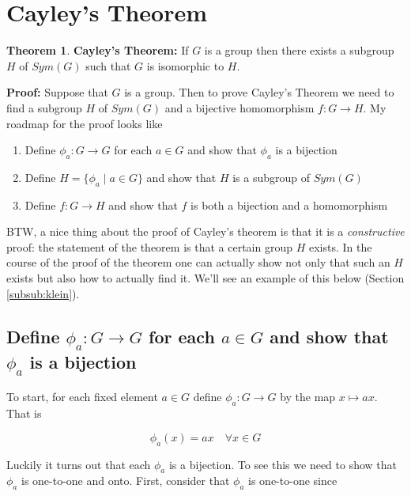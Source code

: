 \documentclass[11pt, oneside]{article}   	%
\theoremstyle{definition}
\newtheorem{thm}{Theorem}[section]
\begin{document}
\section{Cayley's Theorem}

\begin{thm}
\textbf{Cayley's Theorem: }If $G$ is a group then there exists a subgroup $H$ of $Sym(G)$ such that $G$ is isomorphic to $H$.
\label{thm:caley}
\end{thm}

\noindent
\textbf{Proof:} Suppose that $G$ is a group.  Then to prove Cayley's Theorem we need to find a subgroup $H$ of $Sym(G)$ and a bijective homomorphism 
$f: G \rightarrow H$. My roadmap for the proof looks like

\bigskip
\begin{enumerate}
\item Define $\phi_{a}: G \rightarrow G$ for each $a \in G$ and show that $\phi_{a}$ is a bijection 
\item Define $H = \{\phi_{a} \mid a \in G\}$ and show that $H$ is a subgroup of $Sym(G)$
\item Define $f:G \rightarrow H$ and show that $f$ is both a bijection and a homomorphism
\end{enumerate}

\bigskip
\noindent
BTW, a nice thing about the proof of Cayley's theorem is that it is a \emph{constructive} proof: the statement of the theorem is that a certain group $H$ exists. 
In the course of the proof of the theorem one can actually show not only that such an $H$ exists but also how to actually find it. We'll see an example of this
below (Section \ref{subsub:klein}).


\subsection{Define $\phi_{a}: G \rightarrow G$ for each $a \in G$ and show that $\phi_{a}$ is a bijection}
To start, for each fixed element $a \in G$ define $\phi_{a}: G \rightarrow G$ by the map $x \mapsto ax$. That is 

\begin{equation}
\phi_{a}(x) = ax \quad \forall x \in G
\label{eqn:phi}
\end{equation}


\bigskip
\noindent
Luckily it turns out that each $\phi_{a}$ is a bijection.  To see this we need to show that $\phi_a$ is one-to-one and onto. 
First,  consider that $\phi_a$  is one-to-one since
\end{document}
